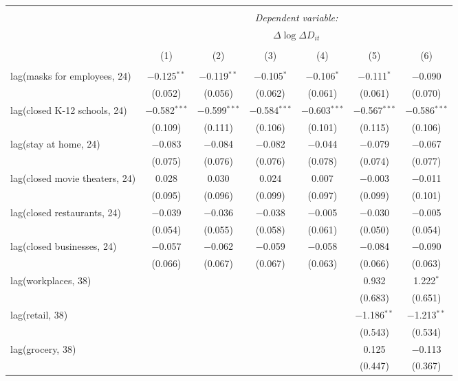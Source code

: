 \begin{tabular}{@{\extracolsep{1pt}}lcccccc} 
\\[-1.8ex]\hline 
\hline \\[-1.8ex] 
 & \multicolumn{6}{c}{\textit{Dependent variable:}} \\ 
\cline{2-7} 
 & \multicolumn{6}{c}{$\Delta \log \Delta D_{it}$} \\ 
\\[-1.8ex] & (1) & (2) & (3) & (4) & (5) & (6)\\ 
\hline \\[-1.8ex] 
 lag(masks for employees, 24) & $-$0.125$^{**}$ & $-$0.119$^{**}$ & $-$0.105$^{*}$ & $-$0.106$^{*}$ & $-$0.111$^{*}$ & $-$0.090 \\ 
  & (0.052) & (0.056) & (0.062) & (0.061) & (0.061) & (0.070) \\ 
  lag(closed K-12 schools, 24) & $-$0.582$^{***}$ & $-$0.599$^{***}$ & $-$0.584$^{***}$ & $-$0.603$^{***}$ & $-$0.567$^{***}$ & $-$0.586$^{***}$ \\ 
  & (0.109) & (0.111) & (0.106) & (0.101) & (0.115) & (0.106) \\ 
  lag(stay at home, 24) & $-$0.083 & $-$0.084 & $-$0.082 & $-$0.044 & $-$0.079 & $-$0.067 \\ 
  & (0.075) & (0.076) & (0.076) & (0.078) & (0.074) & (0.077) \\ 
  lag(closed movie theaters, 24) & 0.028 & 0.030 & 0.024 & 0.007 & $-$0.003 & $-$0.011 \\ 
  & (0.095) & (0.096) & (0.099) & (0.097) & (0.099) & (0.101) \\ 
  lag(closed restaurants, 24) & $-$0.039 & $-$0.036 & $-$0.038 & $-$0.005 & $-$0.030 & $-$0.005 \\ 
  & (0.054) & (0.055) & (0.058) & (0.061) & (0.050) & (0.054) \\ 
  lag(closed businesses, 24) & $-$0.057 & $-$0.062 & $-$0.059 & $-$0.058 & $-$0.084 & $-$0.090 \\ 
  & (0.066) & (0.067) & (0.067) & (0.063) & (0.066) & (0.063) \\ 
  lag(workplaces, 38) &  &  &  &  & 0.932 & 1.222$^{*}$ \\ 
  &  &  &  &  & (0.683) & (0.651) \\ 
  lag(retail, 38) &  &  &  &  & $-$1.186$^{**}$ & $-$1.213$^{**}$ \\ 
  &  &  &  &  & (0.543) & (0.534) \\ 
  lag(grocery, 38) &  &  &  &  & 0.125 & $-$0.113 \\ 
  &  &  &  &  & (0.447) & (0.367) \\ 

\end{tabular}
